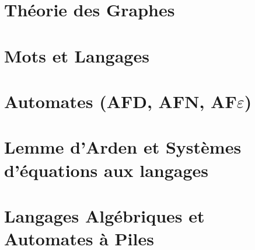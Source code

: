 



\chapter{Théorie des Graphes}


\chapter{Mots et Langages}


\chapter{Automates (AFD, AFN, AF$\varepsilon$)}


\chapter{Lemme d'Arden et Systèmes d'équations aux langages}


\chapter{Langages Algébriques et Automates à Piles}



